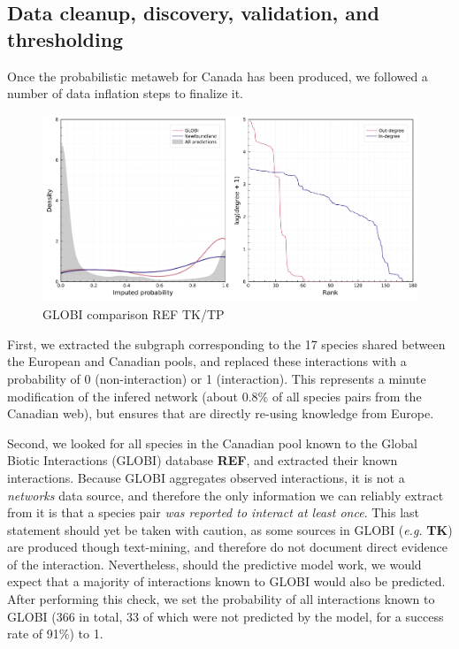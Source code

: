 \documentclass[10pt,oneside]{article}
\makeatletter
\def\maxwidth{\ifdim\Gin@nat@width>\linewidth\linewidth
\else\Gin@nat@width\fi}
\let\Oldincludegraphics\includegraphics
\renewcommand{\includegraphics}[1]{\Oldincludegraphics[width=\maxwidth]{#1}}
\makeatother
\begin{document}
\hypertarget{data-cleanup-discovery-validation-and-thresholding}{%
\subsection{Data cleanup, discovery, validation, and
thresholding}\label{data-cleanup-discovery-validation-and-thresholding}}

Once the probabilistic metaweb for Canada has been produced, we followed
a number of data inflation steps to finalize it.

\begin{figure}
\hypertarget{fig:inflation}{%
\centering
\includegraphics{figures/figure-validation.png}
\caption{GLOBI comparison REF TK/TP}\label{fig:inflation}
}
\end{figure}

First, we extracted the subgraph corresponding to the 17 species shared
between the European and Canadian pools, and replaced these interactions
with a probability of 0 (non-interaction) or 1 (interaction). This
represents a minute modification of the infered network (about 0.8\% of
all species pairs from the Canadian web), but ensures that are directly
re-using knowledge from Europe.

Second, we looked for all species in the Canadian pool known to the
Global Biotic Interactions (GLOBI) database \textbf{REF}, and extracted
their known interactions. Because GLOBI aggregates observed
interactions, it is not a \emph{networks} data source, and therefore the
only information we can reliably extract from it is that a species pair
\emph{was reported to interact at least once}. This last statement
should yet be taken with caution, as some sources in GLOBI (\emph{e.g.}
\textbf{TK}) are produced though text-mining, and therefore do not
document direct evidence of the interaction. Nevertheless, should the
predictive model work, we would expect that a majority of interactions
known to GLOBI would also be predicted. After performing this check, we
set the probability of all interactions known to GLOBI (366 in total, 33
of which were not predicted by the model, for a success rate of 91\%) to
1.
\end{document}

